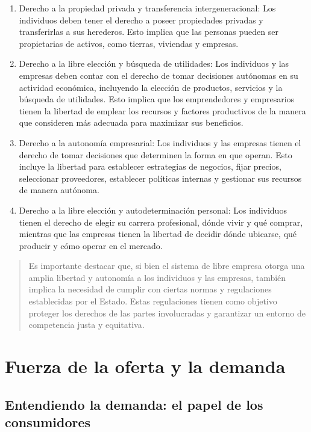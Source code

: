 \documentclass[
  man,
  floatsintext,
  longtable,
  a4paper,
  nolmodern,
  notxfonts,
  notimes,
  colorlinks=true,linkcolor=blue,citecolor=blue,urlcolor=blue]{apa7}
\begin{document}
\begin{enumerate}
\def\labelenumi{\arabic{enumi}.}
\item
  Derecho a la propiedad privada y transferencia intergeneracional: Los
  individuos deben tener el derecho a poseer propiedades privadas y
  transferirlas a sus herederos. Esto implica que las personas pueden
  ser propietarias de activos, como tierras, viviendas y empresas.
\item
  Derecho a la libre elección y búsqueda de utilidades: Los individuos y
  las empresas deben contar con el derecho de tomar decisiones autónomas
  en su actividad económica, incluyendo la elección de productos,
  servicios y la búsqueda de utilidades. Esto implica que los
  emprendedores y empresarios tienen la libertad de emplear los recursos
  y factores productivos de la manera que consideren más adecuada para
  maximizar sus beneficios.
\item
  Derecho a la autonomía empresarial: Los individuos y las empresas
  tienen el derecho de tomar decisiones que determinen la forma en que
  operan. Esto incluye la libertad para establecer estrategias de
  negocios, fijar precios, seleccionar proveedores, establecer políticas
  internas y gestionar sus recursos de manera autónoma.
\item
  Derecho a la libre elección y autodeterminación personal: Los
  individuos tienen el derecho de elegir su carrera profesional, dónde
  vivir y qué comprar, mientras que las empresas tienen la libertad de
  decidir dónde ubicarse, qué producir y cómo operar en el mercado.
\end{enumerate}

\begin{quote}
Es importante destacar que, si bien el sistema de libre empresa otorga
una amplia libertad y autonomía a los individuos y las empresas, también
implica la necesidad de cumplir con ciertas normas y regulaciones
establecidas por el Estado. Estas regulaciones tienen como objetivo
proteger los derechos de las partes involucradas y garantizar un entorno
de competencia justa y equitativa.
\end{quote}

\section{Fuerza de la oferta y la
demanda}\label{fuerza-de-la-oferta-y-la-demanda}

\subsection{Entendiendo la demanda: el papel de los
consumidores}\label{entendiendo-la-demanda-el-papel-de-los-consumidores}
\end{document}
